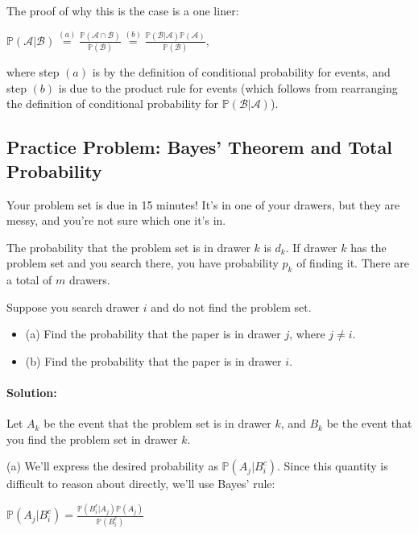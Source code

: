 \documentclass[6008notes.tex]{subfiles}
\begin{document}
The proof of why this is the case is a one liner:

{\centering$\mathbb {P}(\mathcal{A} | \mathcal{B}) \overset {(a)}{=} \frac{\mathbb {P}(\mathcal{A} \cap \mathcal{B})}{\mathbb {P}(\mathcal{B})} \overset {(b)}{=} \frac{\mathbb {P}(\mathcal{B} | \mathcal{A}) \mathbb {P}(\mathcal{A})}{\mathbb {P}(\mathcal{B})},$ \par}
 
where step $(a)$ is by the definition of conditional probability for events, and step $(b)$ is due to the product rule for events (which follows from rearranging the definition of conditional probability for $\mathbb {P}(\mathcal{B} | \mathcal{A})$).

\subsection{Practice Problem: Bayes' Theorem and Total Probability}

Your problem set is due in 15 minutes! It's in one of your drawers, but they are messy, and you're not sure which one it's in.

The probability that the problem set is in drawer $k$ is $d_k$. If drawer $k$ has the problem set and you search there, you have probability $p_k$ of finding it. There are a total of $m$ drawers.

Suppose you search drawer $i$ and do not find the problem set.

\begin{itemize}
\item (a) Find the probability that the paper is in drawer $j$, where $j \neq i$.

\item (b) Find the probability that the paper is in drawer $i$.
\end{itemize}

\paragraph{Solution:} Let $A_k$ be the event that the problem set is in drawer $k$, and $B_k$ be the event that you find the problem set in drawer $k$.

(a) We'll express the desired probability as $\mathbb {P}(A_ j|B_ i^ c)$. Since this quantity is difficult to reason about directly, we'll use Bayes' rule:

{\centering$\mathbb {P}(A_ j|B_ i^ c) = \frac{\mathbb {P}(B_ i^ c | A_ j) \mathbb {P}(A_ j)}{\mathbb {P}(B_ i^ c)}$ \par}
 
\end{document}
